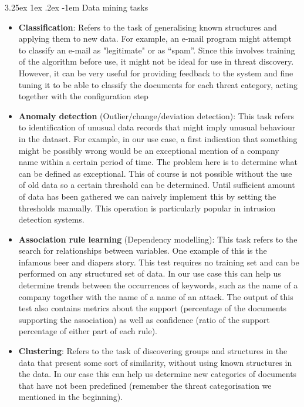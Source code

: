 \documentclass[12pt]{article}
\makeatletter
\renewcommand\paragraph{\@startsection{paragraph}{5}{\z@}%
  {3.25ex \@plus1ex \@minus.2ex}%
  {-1em}%
  {\normalfont\normalsize\bfseries}}
\makeatother
\begin{document}
\paragraph{Data mining tasks}
\begin{itemize}
\item 
\textbf{Classification}: Refers to the task of generalising known structures and applying them to new
data. For example, an e-mail program might attempt to classify an e-mail as "legitimate" or as
“spam”. Since this involves training of the algorithm before use, it might not be ideal for use in
threat discovery. However, it can be very useful for providing feedback to the system and fine
tuning it to be able to classify the documents for each threat category, acting together with the
configuration step
\item 
\textbf{Anomaly detection} (Outlier/change/deviation detection): This task refers to identification of
unusual data records that might imply unusual behaviour in the dataset. For example, in our
use case, a first indication that something might be possibly wrong would be an exceptional
mention of a company name within a certain period of time. The problem here is to determine
what can be defined as exceptional. This of course is not possible without the use of old data
so a certain threshold can be determined. Until sufficient amount of data has been gathered we
can naively implement this by setting the thresholds manually. This operation is particularly
popular in intrusion detection systems.
\item 
\textbf{Association rule learning} (Dependency modelling): This task refers to the search for
relationships between variables. One example of this is the infamous beer and diapers story.
This test requires no training set and can be performed on any structured set of data. In our
use case this can help us determine trends between the occurrences of keywords, such as the
name of a company together with the name of a name of an attack. The output of this test also
contains metrics about the support (percentage of the documents supporting the association) as well as
confidence (ratio of the support percentage of either part of each rule).
\item 
\textbf{Clustering}: Refers to the task of discovering groups and structures in the data that present
some sort of similarity, without using known structures in the data. In our case this can help us
determine new categories of documents that have not been predefined (remember the threat
categorisation we mentioned in the beginning).

\end{itemize}
\end{document}
